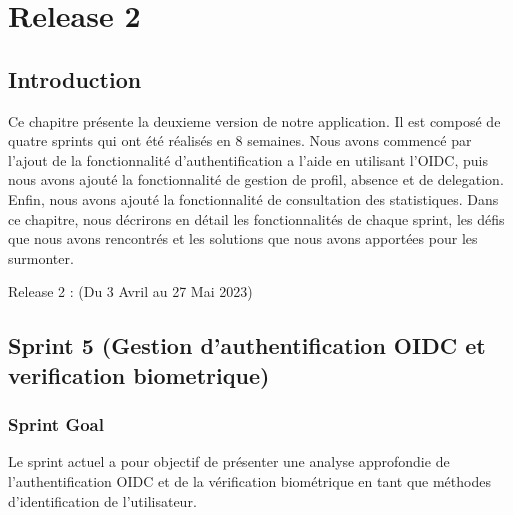 \chapter*{Release 2}
\label{chap:release2}
\setcounter{part}{0}
\setcounter{chapter}{0}
\setcounter{section}{0}
\renewcommand{\thechapter}{\arabic{chapter}}
\renewcommand{\thepart}{\arabic{part}}
\renewcommand{\thesection}{\arabic{section}}

\section*{Introduction}

Ce chapitre présente la deuxieme version de notre application. Il est composé de quatre sprints qui ont été réalisés en 8 semaines. Nous avons commencé par l'ajout de la fonctionnalité d'authentification a l'aide en utilisant l'OIDC, puis nous avons ajouté la fonctionnalité de gestion de profil, absence et de delegation. Enfin, nous avons ajouté la fonctionnalité de consultation des statistiques. Dans ce chapitre, nous décrirons en détail les fonctionnalités de chaque sprint, les défis que nous avons rencontrés et les solutions que nous avons apportées pour les surmonter.

Release 2 : (Du 3 Avril au 27 Mai 2023)


\section{Sprint 5 (Gestion d'authentification OIDC et verification biometrique)}

\subsection{Sprint Goal}
Le sprint actuel a pour objectif de présenter une analyse approfondie de l'authentification OIDC et de la vérification biométrique en tant que méthodes d'identification de l'utilisateur.

